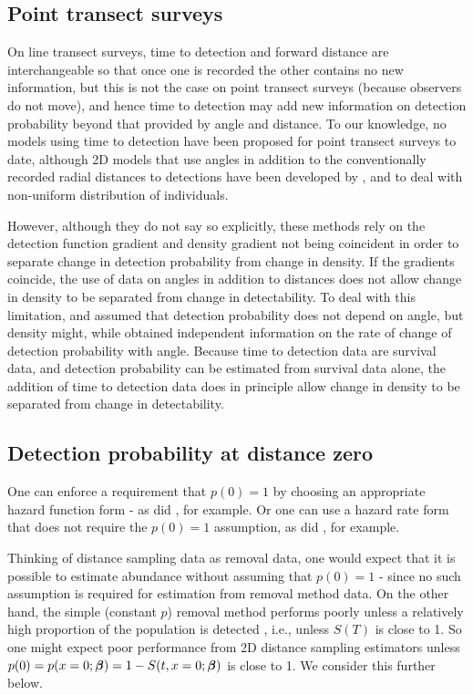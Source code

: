 \documentclass[useAMS,usenatbib,referee]{biom}
\begin{document}
\subsection{Point transect surveys}

On line transect surveys, time to detection and forward distance are interchangeable so that once one is recorded the other contains no new information, but this is not the case on point transect surveys (because observers do not move), and hence time to detection may add new information on detection probability beyond that provided by angle and distance. To our knowledge, no models using time to detection have been proposed for point transect surveys to date, although 2D models that use angles in addition to the conventionally recorded radial distances to detections have been developed by \cite{Marques+al:10a}, \cite{Cox+al:11} and \cite{Arranz+al:14} to deal with non-uniform distribution of individuals. 

However, although they do not say so explicitly, these methods rely on the detection function gradient and density gradient not being coincident in order to separate change in detection probability from change in density. If the gradients coincide, the use of data on angles in addition to distances does not allow change in density to be separated from change in detectability. To deal with this limitation, \cite{Marques+al:10a} and \cite{Arranz+al:14} assumed that detection probability does not depend on angle, but density might, while \cite{Cox+al:11} obtained independent information on the rate of change of detection probability with angle. Because time to detection data are survival data, and detection probability can be estimated from survival data alone, the addition of time to detection data does in principle allow change in density to be separated from change in detectability.


\subsection{Detection probability at distance zero}

One can enforce a requirement that $p(0)=1$ by choosing an appropriate hazard function form - as did \cite{Hayes+Buckland:83}, for example. Or one can use a hazard rate form that does not require the $p(0)=1$ assumption, as did \cite{Langrock+al:13}, for example. 

Thinking of distance sampling data as removal data, one would expect that it is possible to estimate abundance without assuming that $p(0)=1$ - since no such assumption is required for estimation from removal method data. On the other hand, the simple (constant $p$) removal method performs poorly unless a relatively high proportion of the population is detected \citep[see][Table 7.3, for example]{Seber:82}, i.e., unless $S(T)$ is close to 1. So one might expect poor performance from 2D distance sampling estimators unless $p(0)=p(x=0;{\mbox{\boldmath $\beta$}})=1-S(t,x=0;{\mbox{\boldmath $\beta$}})$ is close to 1. We consider this further below.
\end{document}
